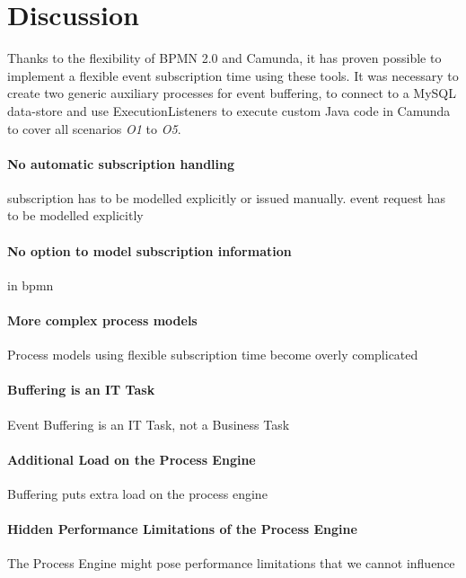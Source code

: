 


\section{Discussion}
Thanks to the flexibility of BPMN 2.0 and Camunda, it has proven possible to implement a flexible event subscription time using these tools. It was necessary to create two generic auxiliary processes for event buffering, to connect to a MySQL data-store and use ExecutionListeners to execute custom Java code in Camunda to cover all scenarios \textit{O1} to \textit{O5}.




\paragraph{No automatic subscription handling\newline}
subscription has to be modelled explicitly or issued manually. event request has to be modelled explicitly

\paragraph{No option to model subscription information}
in bpmn

\paragraph{More complex process models\newline}

Process models using flexible subscription time become overly complicated

\paragraph{Buffering is an IT Task\newline}

Event Buffering is an IT Task, not a Business Task

\paragraph{Additional Load on the Process Engine\newline}

Buffering puts extra load on the process engine

\paragraph{Hidden Performance Limitations of the Process Engine\newline}

The Process Engine might pose performance limitations that we cannot influence

